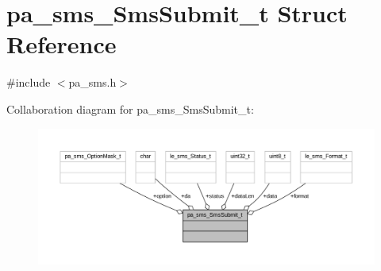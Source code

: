 \hypertarget{structpa__sms___sms_submit__t}{}\section{pa\+\_\+sms\+\_\+\+Sms\+Submit\+\_\+t Struct Reference}
\label{structpa__sms___sms_submit__t}


{\ttfamily \#include $<$pa\+\_\+sms.\+h$>$}



Collaboration diagram for pa\+\_\+sms\+\_\+\+Sms\+Submit\+\_\+t\+:
\nopagebreak
\begin{figure}[H]
\begin{center}
\leavevmode
\includegraphics[width=350pt]{structpa__sms___sms_submit__t__coll__graph}
\end{center}
\end{figure}
